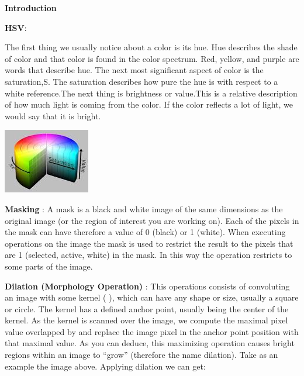 \documentclass[report]{res}
\begin{document}
	\pagebreak
	
	
	\begin{center}
		\textbf{\huge Introduction} \\
	\end{center}
	
	\textbf{HSV}:
	
	The first thing we usually notice about a color is its hue.   Hue describes the shade of color and that color is found in the color spectrum. Red, yellow, and purple are words that describe hue. The next most significant aspect of color is the saturation,S. The saturation describes how pure the hue is with respect to a white reference.The next thing is brightness or value.This is a relative description of how much light is coming from the color. If the color reflects a lot of light, we would say that it is bright.\\
	
	\begin{center}
	\includegraphics{graphics/hsv.jpg}
	\end{center}
	
	\textbf{Masking }:
	A mask is a black and white image of the same dimensions as the original image (or the region of interest you are working on). Each of the pixels in the mask can have therefore a value of 0 (black) or 1 (white). 
	When executing operations on the image the mask is used to restrict the result to the pixels that are 1 (selected, active, white) in the mask. In this way the operation restricts to some parts of the image.
	
	\textbf{Dilation (Morphology Operation) } :
	This operations consists of convoluting an image   with some kernel ( ), which can have any shape or size, usually a square or circle. The kernel   has a defined anchor point, usually being the center of the kernel. As the kernel is scanned over the image, we compute the maximal pixel value overlapped by and replace the image pixel in the anchor point position with that maximal value. As you can deduce, this maximizing operation causes bright regions within an image to “grow” (therefore the name dilation). Take as an example the image above. Applying dilation we can get:\\	
	
\end{document}
